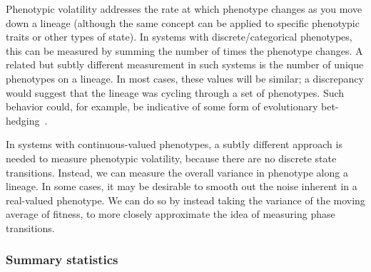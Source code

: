 \documentclass[letterpaper]{article}
\begin{document}
Phenotypic volatility addresses the rate at which phenotype changes as you move down a lineage (although the same concept can be applied to specific phenotypic traits or other types of state). In systems with discrete/categorical phenotypes, this can be measured by summing the number of times the phenotype changes. A related but subtly different measurement in such systems is the number of unique phenotypes on a lineage. In most cases, these values will be similar; a discrepancy
would suggest that the lineage was %
cycling through a set of
phenotypes. Such behavior could, for example, be indicative of some form of evolutionary bet-hedging~\citep{beaumont2009experimental}. %

In systems with continuous-valued phenotypes, a subtly different approach is needed to measure phenotypic volatility, because there are no discrete state transitions. Instead, we can measure the overall variance in phenotype along a lineage. In some cases, it may be desirable to smooth out the noise inherent in a real-valued phenotype. We can do so by instead taking the variance of the moving average of fitness, to more closely approximate the idea of measuring phase transitions.


\subsubsection{Summary statistics}
\end{document}
